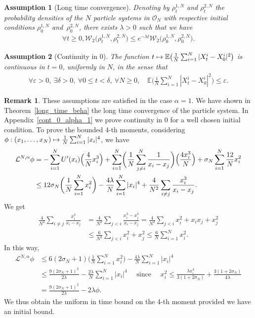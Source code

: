 \documentclass[JEP,XML,SOM,Unicode,published]{cedram}
\newcommand\mto{\mathchoice{\longmapsto}{\mapsto}{\mapsto}{\mapsto}}
\let\epsilon\varepsilon
\theoremstyle{plain}
\newtheorem{assumption}{Assumption}
\theoremstyle{definition}
\newtheorem{remark}{Remark}[section]
\begin{document}
\begin{assumption}[Long time convergence]\label{Hyp_long_time_cv}
Denoting by $\rho^{1,N}_t$ and $\rho^{2,N}_t$ the probability densities of the $N$ particle systems in $\mathcal{O}_N$ with respective initial conditions $\rho^{1,N}_0$ and~$\rho^{2,N}_0$, there exists $\lambda>0$ such that we have
\begin{align*}
\forall t\geq0, \mathcal{W}_2\bigl(\rho^{1,N}_t,\rho^{2,N}_t\bigr)\leq e^{-\lambda t}\mathcal{W}_2\bigl(\rho^{1,N}_0,\rho^{2,N}_0\bigr).
\end{align*}
\end{assumption}

\begin{assumption}[Continuity in 0]\label{Hyp_cont}
The function $t\mto\mathbb{E}\bigl(\frac{1}{N}\sum_{i=1}^N|X^i_t-X^i_0|^2\bigr)$ is continuous in $t=0$, uniformly in $N$, in the sense that
\begin{align*}
\forall \epsilon>0,\ \exists \delta>0,\ \forall 0\leq t<\delta,\ \forall N\geq0,\quad \mathbb{E}\biggl(\frac{1}{N}\sum_{i=1}^N|X^i_t-X^i_0|^2\biggr)\leq\epsilon.
\end{align*}
\end{assumption}

\begin{remark}
These assumptions are satisfied in the case $\alpha=1$. We have shown in Theorem~\ref{long_time_beha} the long time convergence of the particle system. In Appendix~\ref{cont_0_alpha_1} we prove continuity in 0 for a well chosen initial condition. To prove the bounded 4-th moments, considering $\phi:(x_1,\dots,x_N)\mto \frac{1}{N}\sum_{i=1}^N|x_i|^4$, we have
\begin{align*}
\mathcal{L}^{N,\alpha}\phi&=-\sum_{i=1}^NU'(x_i)\Bigl(\frac{4}{N}x_i^3\Bigr)+\sum_{i=1}^N\biggl(\frac{1}{N}\sum_{j\neq i}^N\frac{1}{x_i-x_j}\biggr)\Bigl(\frac{4x_i^3}{N}\Bigr)+\sigma_N\sum_{i=1}^N \frac{12}{N}x_i^2\\
&\leq 12\sigma_N\biggl(\frac{1}{N}\sum_{i=1}^N x_i^2\biggr)-\frac{4\lambda}{N}\sum_{i=1}^N|x_i|^4+\frac{4}{N^2}\sum_{i\neq j}\frac{x_i^3}{x_i-x_j}.
\end{align*}
We get
\begin{align*}
\frac{4}{N^2}\sum_{i\neq j}\frac{x_i^3}{x_i-x_j}&=\frac{4}{N^2}\sum_{j< i}\frac{x_i^3-x_j^3}{x_i-x_j}=\frac{4}{N^2}\sum_{j< i}x_i^2+x_ix_j+x_j^2\\
&\leq\frac{6}{N^2}\sum_{j< i}x_i^2+x_j^2\leq\frac{6}{N}\sum_{i=1}^Nx_i^2.
\end{align*}
In this way,
\begin{align*}
\mathcal{L}^{N,\alpha}\phi&\leq 6\left(2\sigma_N+1\right)\biggl(\frac{1}{N}\sum_{i=1}^N x_i^2\biggr)-\frac{4\lambda}{N}\sum_{i=1}^N|x_i|^4\\
&\leq \frac{9\left(2\sigma_N+1\right)^2}{2\lambda}-\frac{2\lambda}{N}\sum_{i=1}^N|x_i|^4\quad \text{ since }\quad x_i^2\leq \frac{\lambda x_i^4}{3(1+2\sigma_N)}+\frac{3(1+2\sigma_N)}{4\lambda }\\
&=\frac{9\left(2\sigma_N+1\right)^2}{2\lambda}-2\lambda\phi.
\end{align*}
We thus obtain the uniform in time bound on the 4-th moment provided we have an initial bound.
\end{remark}
\end{document}

